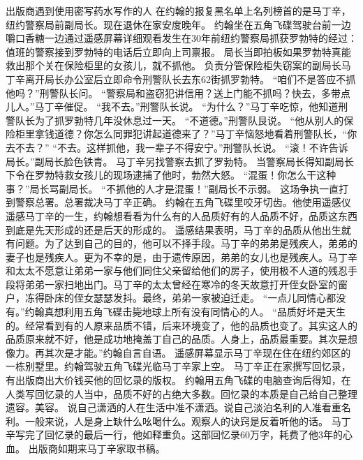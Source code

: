 \documentclass[a4paper,12pt,UTF8,twoside]{ctexbook}
\begin{document}
        出版商遇到使用密写药水写作的人    
        在约翰的报复黑名单上名列榜首的是马丁辛，纽约警察局前副局长。现在退休在家安度晚年。  
        约翰坐在五角飞碟驾驶台前一边嚼口香糖一边通过遥感屏幕详细观看发生在30年前纽约警察局抓获罗勃特的经过：  
        值班的警察接到罗勃特的电话后立即向上司禀报。  
        局长当即拍板如果罗勃特真能救出那个关在保险柜里的女孩儿，就不抓他。  
        负责分管保险柜失窃案的副局长马丁辛离开局长办公室后立即命令刑警队长去东62街抓罗勃特。        
        “咱们不是答应不抓他吗？”刑警队长问。  
        “警察局和盗窃犯讲信用？送上门能不抓吗？快去，多带点儿人。”马丁辛催促。  
        “我不去。”刑警队长说。  
        “为什么？”马丁辛吃惊，他知道刑警队长为了抓罗勃特几年没休息过一天。  
        “不道德。”刑警队艮说。  
        “他从别人的保险柜里拿钱道德？你怎么同罪犯讲起道德来了？”马丁辛恼怒地看着刑警队长，“你去不去？”  
        “不去。这样抓他，我一辈子不得安宁。”刑警队长说。  
        “滚！不许告诉局长。”副局长脸色铁青。  
        马丁辛另找警察去抓了罗勃特。  
        当警察局长得知副局长下令在罗勃特救女孩儿的现场逮捕了他时，勃然大怒。  
        “混蛋！你怎么干这种事？”局长骂副局长。  
        “不抓他的人才是混蛋！”副局长不示弱。  
        这场争执一直打到警察总署。总署裁决马丁辛正确。  
        约翰在五角飞碟里咬牙切齿。他使用遥感仪遥感马丁辛的一生，约翰想看看为什么有的人品质好有的人品质不好，品质这东西到底是先天形成的还是后天的形成的。        
        遥感结果表明，马丁辛的品质从他出生就有问题。为了达到自己的目的，他可以不择手段。马丁辛的弟弟是残疾人，弟弟的妻子也是残疾人。更为不幸的是，由于遗传原因，弟弟的女儿也是残疾人。马丁辛和太太不愿意让弟弟一家与他们同住父亲留给他们的房子，使用极不人道的残忍手段将弟弟一家扫地出门。马丁辛的太太曾经在寒冷的冬天故意打开侄女卧室的窗户，冻得卧床的侄女瑟瑟发抖。最终，弟弟一家被迫迁走。  
        “一点儿同情心都没有。”约翰真想利用五角飞碟击毙地球上所有没有同情心的人。  
        “品质好坏是天生的。经常看到有的人原来品质不错，后来环境变了，他的品质也变了。其实这人的品质原来就不好，他是成功地掩盖丁自己的品质。人身上，品质最重要。其次是想像力。再其次是才能。”约翰自言自语。  
        遥感屏幕显示马丁辛现在住在纽约郊区的一栋别墅里。约翰驾驶五角飞碟光临马丁辛家上空。  
        马丁辛正在家撰写回忆录，有出版商出大价钱买他的回忆录的版权。  
        约翰用五角飞碟的电脑查询后得知，在人类写回忆录的人当中，品质不好的占绝大多数。回忆录的本质是自己给自己整理遗容。美容。  
        说自己潇洒的人在生活中准不潇洒。说自己淡泊名利的人准看重名利。一般来说，人是身上缺什么吆喝什么。观察人的诀窍是反着听他的话。  
        马丁辛写完了回忆录的最后一行，他如释重负。这部回忆录60万字，耗费了他3年的心血。  
        出版商如期来马丁辛家取书稿。  
\end{document}
